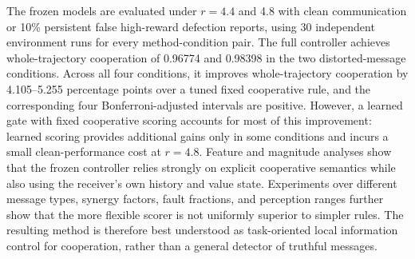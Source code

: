 \begin{abstract*}
The frozen models are evaluated under $r=4.4$ and 4.8 with clean communication or 10\% persistent false high-reward defection reports, using 30 independent environment runs for every method-condition pair. The full controller achieves whole-trajectory cooperation of 0.96774 and 0.98398 in the two distorted-message conditions. Across all four conditions, it improves whole-trajectory cooperation by 4.105--5.255 percentage points over a tuned fixed cooperative rule, and the corresponding four Bonferroni-adjusted intervals are positive. However, a learned gate with fixed cooperative scoring accounts for most of this improvement: learned scoring provides additional gains only in some conditions and incurs a small clean-performance cost at $r=4.8$. Feature and magnitude analyses show that the frozen controller relies strongly on explicit cooperative semantics while also using the receiver's own history and value state. Experiments over different message types, synergy factors, fault fractions, and perception ranges further show that the more flexible scorer is not uniformly superior to simpler rules. The resulting method is therefore best understood as task-oriented local information control for cooperation, rather than a general detector of truthful messages.
\end{abstract*}
